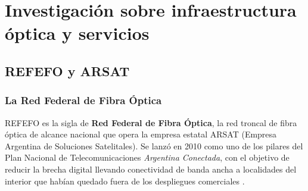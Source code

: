 \section{Investigación sobre infraestructura óptica y servicios}
\label{sec:investigacion}

\subsection{REFEFO y ARSAT}
\label{sec:refefo}

\subsubsection{La Red Federal de Fibra Óptica}
REFEFO es la sigla de \textbf{Red Federal de Fibra Óptica}, la red troncal de fibra óptica de alcance nacional que opera la empresa estatal ARSAT (Empresa Argentina de Soluciones Satelitales). Se lanzó en 2010 como uno de los pilares del Plan Nacional de Telecomunicaciones \textit{Argentina Conectada}, con el objetivo de reducir la brecha digital llevando conectividad de banda ancha a localidades del interior que habían quedado fuera de los despliegues comerciales \cite{libro_catedra, arsat_refefo}.

